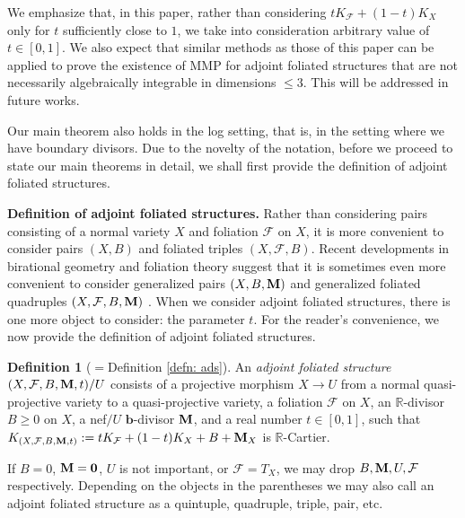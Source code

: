 \documentclass[12pt]{amsart}
\newcommand{\roberto}[1]{{\textcolor{violet}{[Roberto: #1]}}}
\numberwithin{equation}{section}
\newcommand{\bb}{\bm{b}}
\newcommand{\Mm}{{\bf{M}}}
\newcommand{\Rr}{\mathbb{R}}
\newcommand{\Ff}{\mathcal{F}}
\theoremstyle{definition}
\newtheorem{defn}[thm]{Definition}
\theoremstyle{definition}
\theoremstyle{definition}
\begin{document}
We emphasize that, in this paper, rather than considering $tK_{\Ff}+(1-t)K_X$ only for $t$ sufficiently close to $1$, we take into consideration arbitrary value of $t\in [0,1]$. 
We also expect that similar methods as those of this paper can be applied to prove the existence of MMP for adjoint foliated structures that are not necessarily algebraically integrable in dimensions $\leq 3$. 
This will be addressed in future works.

Our main theorem also holds in the log setting, that is, in the setting where we have boundary divisors. 
Due to the novelty of the notation, before we proceed to state our main theorems in detail, we shall first provide the definition of adjoint foliated structures.

\medskip

\noindent\textbf{Definition of adjoint foliated structures.} 
Rather than considering pairs consisting of a normal variety $X$ and foliation $\Ff$ on $X$, it is more convenient to consider pairs $(X,B)$ and foliated triples $(X,\Ff,B)$. 
Recent developments in birational geometry and foliation theory suggest that it is sometimes even more convenient to consider generalized pairs $(X,B,\Mm)$ \cite{BZ16} and generalized foliated quadruples $(X,\Ff,B,\Mm)$ \cite{LLM23}. When we consider adjoint foliated structures, there is one more object to consider: the parameter $t$. For the reader's convenience, we now provide the definition of adjoint foliated structures.

\begin{defn}[$=$Definition \ref{defn: ads}]\label{defn: ads intro}
An \emph{adjoint foliated structure} $(X,\Ff,B,\Mm,t)/U$ consists of a projective morphism $X\rightarrow U$ from a normal quasi-projective variety to a quasi-projective variety, a foliation $\Ff$ on $X$, an $\Rr$-divisor $B\geq 0$ on $X$,  a nef$/U$ $\bb$-divisor $\Mm$, and a real number $t\in [0,1]$, such that $K_{(X,\Ff,B,\Mm,t)}:=tK_{\Ff}+(1-t)K_X+B+\Mm_X$ is $\Rr$-Cartier. 

If $B=0$, $\Mm=\bm{0}$, $U$ is not important, or $\Ff=T_X$, we may drop $B,\Mm,U,\Ff$ respectively. 
Depending on the objects in the parentheses we may also call an adjoint foliated structure as a quintuple, quadruple, triple, pair, etc. 
\end{defn}
\end{document}
